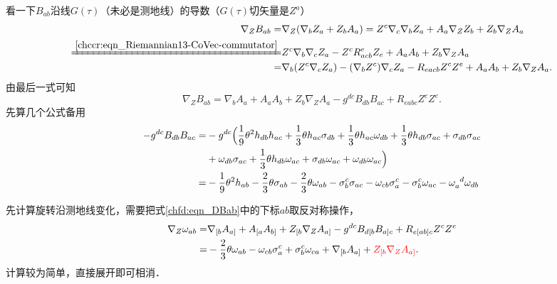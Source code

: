 看一下$B_{ab}$沿线$G(\tau)$（未必是测地线）的导数（$G(\tau)$切矢量是$Z^a$）
\begin{align*}
    \nabla_Z  B_{ab} =&  \nabla_Z (\nabla_b Z_a + Z_b A_a)
    = Z^c\nabla_c\nabla_b Z_a + A_a \nabla_Z Z_b+ Z_b\nabla_Z A_a \\
    \xlongequal{\ref{chccr:eqn_Riemannian13-CoVec-commutator}}&
    Z^c\nabla_b\nabla_c Z_a - Z^c R^e_{acb} Z_e
    + A_a A_b + Z_b\nabla_Z A_a \\
    =& \nabla_b(Z^c\nabla_c Z_a) -(\nabla_b Z^c) \nabla_c Z_a - R_{eacb}Z^c Z^e
      + A_a A_b + Z_b\nabla_Z A_a .
\end{align*}
由最后一式可知
\begin{equation}\label{chfd:eqn_DBab}
    \nabla_Z  B_{ab} = \nabla_b A_a + A_a A_b + Z_b\nabla_Z A_a -g^{dc} B_{db} B_{ac} + R_{eabc}Z^c Z^e .
\end{equation}
先算几个公式备用
\begin{align*}
    -g^{dc} B_{db} B_{ac}= &
    -g^{dc} \Bigl(\frac{1}{9}\theta^2 h_{db} h_{ac}
    + \frac{1}{3}\theta h_{ac}\sigma_{db}+ \frac{1}{3}\theta h_{ac} \omega_{db}
    +\frac{1}{3}\theta h_{db}\sigma_{ac} + \sigma_{db}\sigma_{ac} \\
    & + \omega_{db}\sigma_{ac} +\frac{1}{3}\theta h_{db}\omega_{ac}
    + \sigma_{db}\omega_{ac}    + \omega_{db}\omega_{ac}\Bigr) \\
    =&-\frac{1}{9}\theta^2 h_{ab}
    - \frac{2}{3}\theta\sigma_{ab} - \frac{2}{3}\theta \omega_{ab}
     - \sigma_{b}^c\sigma_{ac} - \omega_{cb}\sigma_{a}^c
     - \sigma_{b}^c\omega_{ac} - \omega_{a}^{\hphantom{a} d}\omega_{db}
\end{align*}

先计算旋转沿测地线变化，需要把式\eqref{chfd:eqn_DBab}中的下标$ab$取反对称操作，
\begin{equation}\label{chfd:eqn_Domega}
\begin{aligned}
    \nabla_Z \omega_{ab}=& \nabla_{[b} A_{a]} + A_{[a} A_{b]} + Z_{[b}\nabla_Z A_{a]}
      -g^{dc} B_{d{[b}} B_{{a]}c} + R_{e[ab]c}Z^c Z^e  \\
    =& - \frac{2}{3}\theta \omega_{ab}
    - \omega_{cb}\sigma_{a}^c + \sigma_{b}^c\omega_{ca}
    + \nabla_{[b} A_{a]} + {\color{red}Z_{[b}\nabla_Z A_{a]} }.
\end{aligned}
\end{equation}
计算较为简单，直接展开即可相消．

